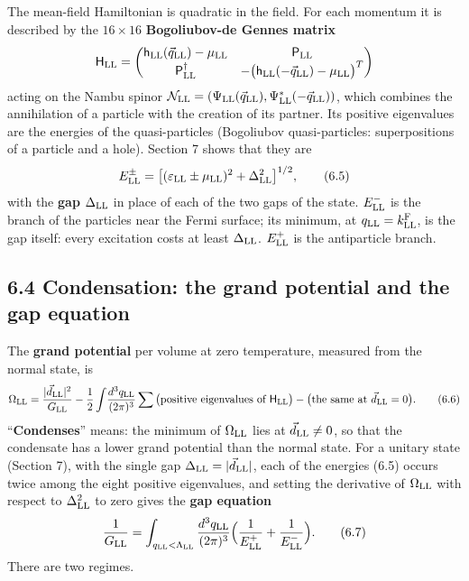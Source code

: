 \documentclass[
  10pt,
]{article}
\begin{document}
The mean-field Hamiltonian is quadratic in the field. For each momentum
it is described by the \(16\times16\) \textbf{Bogoliubov-de Gennes
matrix}
\[\mathsf H_{\rm LL}=\begin{pmatrix}\mathsf h_{\rm LL}(\vec q_{\rm LL})-\mu_{\rm LL}&\mathsf P_{\rm LL}\\\mathsf P_{\rm LL}^\dagger&-\big(\mathsf h_{\rm LL}(-\vec q_{\rm LL})-\mu_{\rm LL}\big)^T\end{pmatrix}\]
acting on the Nambu spinor
\(\mathcal N_{\rm LL}=(\Psi_{\rm LL}(\vec q_{\rm LL}),\Psi^*_{\rm LL}(-\vec q_{\rm LL}))\),
which combines the annihilation of a particle with the creation of its
partner. Its positive eigenvalues are the energies of the
quasi-particles (Bogoliubov quasi-particles: superpositions of a
particle and a hole). Section 7 shows that they are
\[E^\pm_{\rm LL}=\big[(\varepsilon_{\rm LL}\pm\mu_{\rm LL})^2+\Delta_{\rm LL}^2\big]^{1/2}, \tag{6.5}\]
with the \textbf{gap} \(\Delta_{\rm LL}\) in place of each of the two
gaps of the state. \(E^-_{\rm LL}\) is the branch of the particles near
the Fermi surface; its minimum, at \(q_{\rm LL}=k^{\rm F}_{\rm LL}\), is
the gap itself: every excitation costs at least \(\Delta_{\rm LL}\).
\(E^+_{\rm LL}\) is the antiparticle branch.

\hypertarget{condensation-the-grand-potential-and-the-gap-equation}{%
\subsection{6.4 Condensation: the grand potential and the gap
equation}\label{condensation-the-grand-potential-and-the-gap-equation}}

The \textbf{grand potential} per volume at zero temperature, measured
from the normal state, is
\[\Omega_{\rm LL}=\frac{\lvert\vec d_{\rm LL}\rvert^2}{G_{\rm LL}}-\frac12\int\!\frac{d^3q_{\rm LL}}{(2\pi)^3}\sum\big(\text{positive eigenvalues of }\mathsf H_{\rm LL}\big)-\big(\text{the same at }\vec d_{\rm LL}=0\big). \tag{6.6}\]
``\textbf{Condenses}'' means: the minimum of \(\Omega_{\rm LL}\) lies at
\(\vec d_{\rm LL}\neq0\), so that the condensate has a lower grand
potential than the normal state. For a unitary state (Section 7), with
the single gap \(\Delta_{\rm LL}=\lvert\vec d_{\rm LL}\rvert\), each of
the energies (6.5) occurs twice among the eight positive eigenvalues,
and setting the derivative of \(\Omega_{\rm LL}\) with respect to
\(\Delta_{\rm LL}^2\) to zero gives the \textbf{gap equation}
\[\frac1{G_{\rm LL}}=\int_{q_{\rm LL}<\Lambda_{\rm LL}}\frac{d^3q_{\rm LL}}{(2\pi)^3}\Big(\frac1{E^+_{\rm LL}}+\frac1{E^-_{\rm LL}}\Big). \tag{6.7}\]
There are two regimes.
\end{document}
